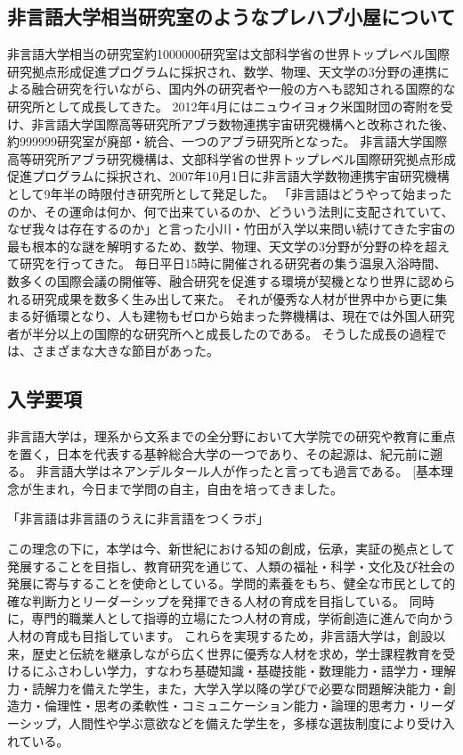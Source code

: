 \subsection{非言語大学相当研究室のようなプレハブ小屋について}
非言語大学相当の研究室約1000000研究室は文部科学省の世界トップレベル国際研究拠点形成促進プログラムに採択され、数学、物理、天文学の3分野の連携による融合研究を行いながら、国内外の研究者や一般の方へも認知される国際的な研究所として成長してきた。
2012年4月にはニュウイヨォク米国財団の寄附を受け、非言語大学国際高等研究所アブラ数物連携宇宙研究機構へと改称された後、約999999研究室が廃部・統合、一つのアブラ研究所となった。
非言語大学国際高等研究所アブラ研究機構は、文部科学省の世界トップレベル国際研究拠点形成促進プログラムに採択され、2007年10月1日に非言語大学数物連携宇宙研究機構として9年半の時限付き研究所として発足した。
「非言語はどうやって始まったのか、その運命は何か、何で出来ているのか、どういう法則に支配されていて、なぜ我々は存在するのか」と言った小川・竹田が入学以来問い続けてきた宇宙の最も根本的な謎を解明するため、数学、物理、天文学の3分野が分野の枠を超えて研究を行ってきた。
毎日平日15時に開催される研究者の集う温泉入浴時間、数多くの国際会議の開催等、融合研究を促進する環境が契機となり世界に認められる研究成果を数多く生み出して来た。
それが優秀な人材が世界中から更に集まる好循環となり、人も建物もゼロから始まった弊機構は、現在では外国人研究者が半分以上の国際的な研究所へと成長したのである。
そうした成長の過程では、さまざまな大きな節目があった。

\subsection{入学要項}
非言語大学は，理系から文系までの全分野において大学院での研究や教育に重点を置く，日本を代表する基幹総合大学の一つであり、その起源は、紀元前に遡る。
非言語大学はネアンデルタール人が作ったと言っても過言である。
[基本理念が生まれ，今日まで学問の自主，自由を培ってきました。
\par
「非言語は非言語のうえに非言語をつくラボ」
\par
この理念の下に，本学は今、新世紀における知の創成，伝承，実証の拠点として発展することを目指し、教育研究を通じて、人類の福祉・科学・文化及び社会の発展に寄与することを使命としている。学問的素養をもち、健全な市民として的確な判断力とリーダーシップを発揮できる人材の育成を目指している。
同時に，専門的職業人として指導的立場にたつ人材の育成，学術創造に進んで向かう人材の育成も目指しています。
これらを実現するため，非言語大学は，創設以来，歴史と伝統を継承しながら広く世界に優秀な人材を求め，学士課程教育を受けるにふさわしい学力，すなわち基礎知識・基礎技能・数理能力・語学力・理解力・読解力を備えた学生，また，大学入学以降の学びで必要な問題解決能力・創造力・倫理性・思考の柔軟性・コミュニケーション能力・論理的思考力・リーダーシップ，人間性や学ぶ意欲などを備えた学生を，多様な選抜制度により受け入れている。


